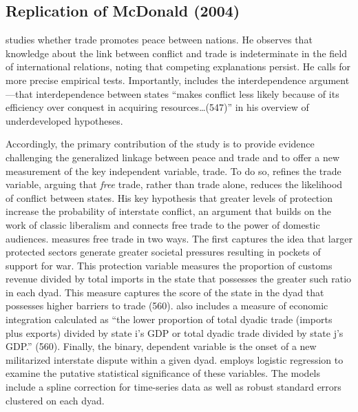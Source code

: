 \documentclass[12pt]{amsart}
\begin{document}

\newpage
\subsection{Replication of McDonald (2004)}

\citet{mcdonald:2004} studies whether trade promotes peace between nations. He observes that knowledge about the link between conflict and trade is indeterminate in the field of international relations, noting that competing explanations persist. He calls for more precise empirical tests.  Importantly, \citet{mcdonald:2004} includes the interdependence argument---that interdependence between states ``makes conflict less likely because of its efficiency over conquest in acquiring resources\ldots (547)'' in his overview of underdeveloped hypotheses. 

Accordingly, the primary contribution of the study is to provide evidence challenging the generalized linkage between peace and trade and to offer a new measurement of the key independent variable, trade. To do so, \citet{mcdonald:2004} refines the trade variable, arguing that \textit{free} trade, rather than trade alone, reduces the likelihood of conflict between states. His key hypothesis that greater levels of protection increase the probability of interstate conflict, an argument that builds on the work of classic liberalism and connects free trade to the power of domestic audiences. \citet{mcdonald:2004} measures free trade in two ways. The first  captures the idea that larger protected sectors generate greater societal pressures resulting in  pockets of support for war. This protection variable measures the proportion of customs revenue divided by total imports in the state that possesses the greater such ratio in each dyad. This measure captures the score of the state in the dyad that possesses higher barriers to trade (560). \citet{mcdonald:2004} also includes a measure of economic integration  calculated as ``the lower proportion of total dyadic trade (imports plus exports) divided by state i's GDP or total dyadic trade divided by state j's GDP.'' (560). Finally, the binary, dependent variable is the onset of a new militarized interstate dispute within a given dyad. \citet{mcdonald:2004} employs logistic regression to examine the putative statistical significance of these variables. The models include a spline correction for time-series data as well as robust standard errors clustered on each dyad.
\end{document}
